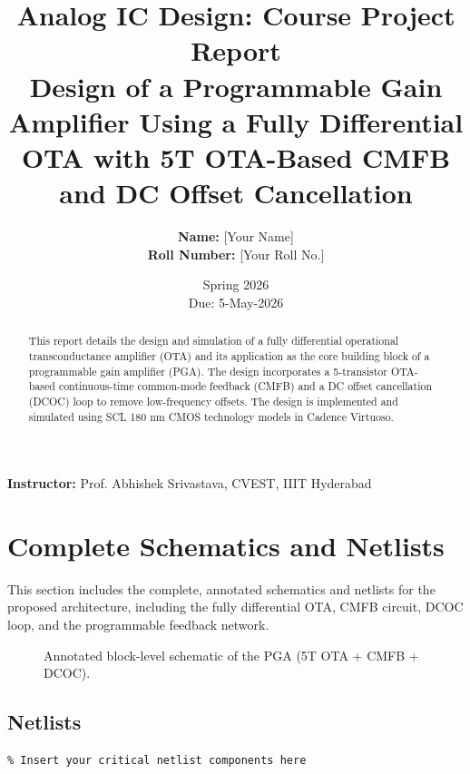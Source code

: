 \documentclass[12pt, a4paper]{article}
\title{\textbf{Analog IC Design: Course Project Report}\\
\large Design of a Programmable Gain Amplifier Using a Fully Differential OTA with 5T OTA-Based CMFB and DC Offset Cancellation}
\author{\textbf{Name:} [Your Name] \\ \textbf{Roll Number:} [Your Roll No.]}
\date{Spring 2026 \\ Due: 5-May-2026}
\begin{document}
\maketitle

\begin{center}
    \textbf{Instructor:} Prof. Abhishek Srivastava, CVEST, IIIT Hyderabad
\end{center}

\vspace{2em}

\begin{abstract}
This report details the design and simulation of a fully differential operational transconductance amplifier (OTA) and its application as the core building block of a programmable gain amplifier (PGA). The design incorporates a 5-transistor OTA-based continuous-time common-mode feedback (CMFB) and a DC offset cancellation (DCOC) loop to remove low-frequency offsets. The design is implemented and simulated using SCL 180 nm CMOS technology models in Cadence Virtuoso.
\end{abstract}

\newpage
\tableofcontents
\newpage

\section{Complete Schematics and Netlists}
This section includes the complete, annotated schematics and netlists for the proposed architecture, including the fully differential OTA, CMFB circuit, DCOC loop, and the programmable feedback network.

\begin{figure}[H]
    \centering
    \caption{Annotated block-level schematic of the PGA (5T OTA + CMFB + DCOC).}
    \label{fig:top_schematic}
\end{figure}

\subsection{Netlists}
\begin{verbatim}
% Insert your critical netlist components here
\end{verbatim}
\end{document}
